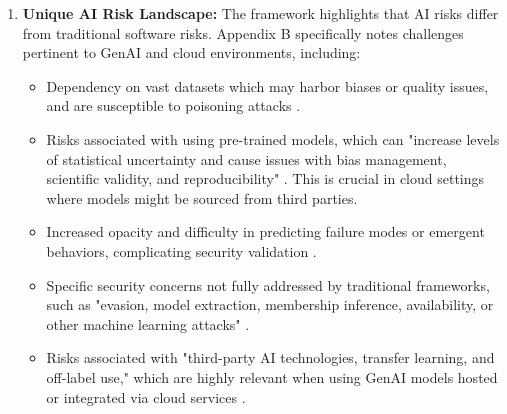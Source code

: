 \begin{enumerate}
    \item \textbf{Unique AI Risk Landscape:} The framework highlights that AI risks differ from traditional software risks. Appendix B specifically notes challenges pertinent to GenAI and cloud environments, including:
    \begin{itemize}
        \item Dependency on vast datasets which may harbor biases or quality issues, and are susceptible to poisoning attacks \cite{tabassi_artificial_2023}.
        \item Risks associated with using pre-trained models, which can "increase levels of statistical uncertainty and cause issues with bias management, scientific validity, and reproducibility" \cite[p.38]{tabassi_artificial_2023}. This is crucial in cloud settings where models might be sourced from third parties.
        \item Increased opacity and difficulty in predicting failure modes or emergent behaviors, complicating security validation \cite{tabassi_artificial_2023}.
        \item Specific security concerns not fully addressed by traditional frameworks, such as "evasion, model extraction, membership inference, availability, or other machine learning attacks" \cite[p.39]{tabassi_artificial_2023}.
        \item Risks associated with "third-party AI technologies, transfer learning, and off-label use," which are highly relevant when using GenAI models hosted or integrated via cloud services \cite[p.39]{tabassi_artificial_2023}.
    \end{itemize}


\end{enumerate}
